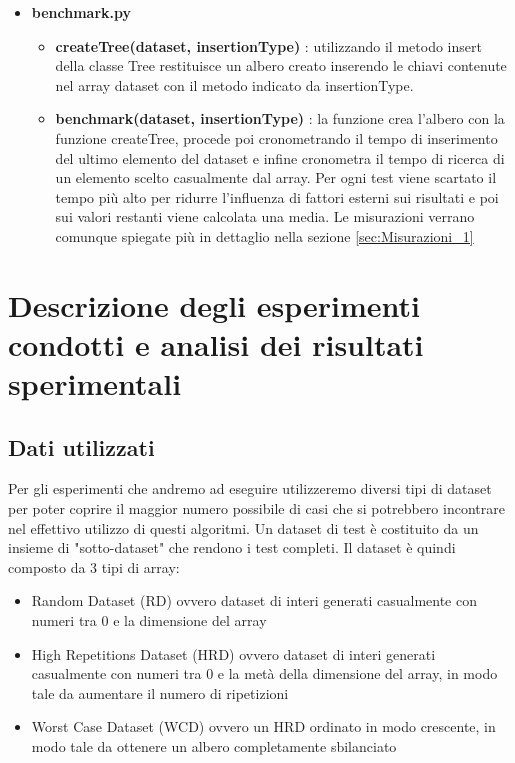 \begin{itemize}
    \item \textbf{benchmark.py}
    \begin{itemize}
    
        \item \textbf{createTree(dataset, insertionType)} : utilizzando il metodo insert della classe Tree restituisce un albero creato inserendo le chiavi contenute nel array dataset con il metodo indicato da insertionType.
        
        \item \textbf{benchmark(dataset, insertionType)} : la funzione crea l'albero con la funzione createTree, procede poi cronometrando il tempo di inserimento del ultimo elemento del dataset e infine cronometra il tempo di ricerca di un elemento scelto casualmente dal array. Per ogni test viene scartato il tempo più alto per ridurre l'influenza di fattori esterni sui risultati e poi sui valori restanti viene calcolata una media. Le misurazioni verrano comunque spiegate più in dettaglio nella sezione \ref{sec:Misurazioni_1}
        
    \end{itemize}
    
\end{itemize}

\newpage
\section{Descrizione degli esperimenti condotti e analisi dei risultati sperimentali}

\subsection{Dati utilizzati}
\label{sec:DatiUtilizzati_1}
Per gli esperimenti che andremo ad eseguire utilizzeremo diversi tipi di dataset per poter coprire il maggior numero possibile di casi che 
si potrebbero incontrare nel effettivo utilizzo di questi algoritmi. Un dataset di test è costituito da un insieme di "sotto-dataset" che rendono i test completi.
Il dataset è quindi composto da 3 tipi di array:
\begin{itemize}
  \item Random Dataset (RD) ovvero dataset di interi generati casualmente con numeri tra 0 e la dimensione del array
  \item High Repetitions Dataset (HRD) ovvero dataset di interi generati casualmente con numeri tra 0 e la metà della dimensione del array, in modo tale da aumentare il numero di ripetizioni 
  \item Worst Case Dataset (WCD) ovvero un HRD ordinato in modo crescente, in modo tale da ottenere un albero completamente sbilanciato
\end{itemize}

